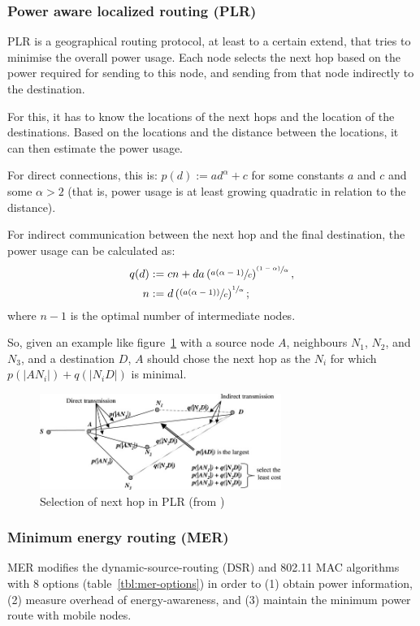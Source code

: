 \documentclass[conference]{IEEEtran}
\begin{document}
\subsubsection{Power aware localized routing (PLR)}
PLR\cite{stojmenovic2001power} is a geographical routing protocol, at least
to a certain extend, that tries to minimise the overall power usage. Each node
selects the next hop based on the power required for sending to this node, and
sending from that node indirectly to the destination.

For this, it has to know the locations of the next hops and the location of
the destinations. Based on the locations and the distance between the locations,
it can then estimate the power usage.

For direct connections, this is:
\( p(d) := ad^{\alpha} + c \)
for some constants $a$ and $c$ and some $\alpha > 2$ (that is, power usage
is at least growing quadratic in relation to the distance).

For indirect communication between the next hop and the final destination,
the power usage can be calculated as:
\begin{align*}
   q(d) &:= cn + da \left(\sfrac{a(\alpha - 1)}{c}\right)^{\sfrac{(1-\alpha)}{\alpha}}, \\
      n &:= d\left(\sfrac{(a(\alpha - 1))}{c}\right)^{\sfrac{1}{\alpha}};
\end{align*}
where $n-1$ is the optimal number of intermediate nodes\cite{stojmenovic2001power}.

So, given an example like figure~\ref{plrexample} with a source node $A$, neighbours $N_{1}$, $N_{2}$, and $N_{3}$, and a
destination $D$, $A$ should chose the next hop as the $N_{i}$ for which
$p(|AN_{i}|) + q(|N_{i}D|)$ is minimal.

\begin{figure}
\centering
\includegraphics[width=0.7\textwidth]{images/plr-example}
\caption{Selection of next hop in PLR (from \cite{alotaibi2012survey})}
\label{plrexample}
\end{figure}

\subsubsection{Minimum energy routing (MER)}
MER\cite{doshi2002demand} modifies the dynamic-source-routing (DSR)\cite{johnson1996dynamic}
and 802.11 MAC algorithms\cite{woesner1998power} with 8 options (table~\ref{tbl:mer-options}) in order to
(1) obtain power information, (2) measure overhead of energy-awareness, and
(3) maintain the minimum power route with mobile nodes.
\end{document}
